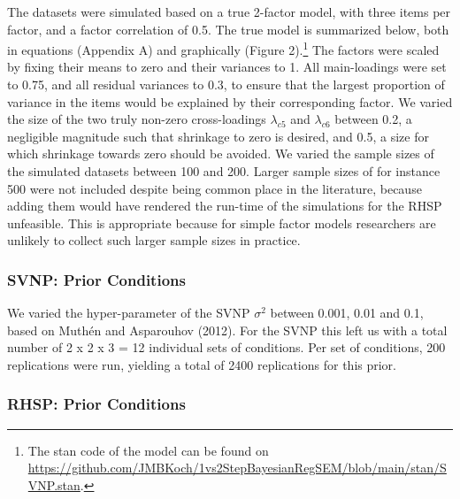 \documentclass[
  man, donotrepeattitle,floatsintext]{apa6}
\begin{document}
The datasets were simulated based on a true 2-factor model, with three items per factor, and a factor correlation of 0.5. The true model is summarized below, both in equations (Appendix A) and graphically (Figure 2).\footnote{The stan code of the model can be found on \url{https://github.com/JMBKoch/1vs2StepBayesianRegSEM/blob/main/stan/SVNP.stan}.} The factors were scaled by fixing their means to zero and their variances to 1. All main-loadings were set to 0.75, and all residual variances to 0.3, to ensure that the largest proportion of variance in the items would be explained by their corresponding factor. We varied the size of the two truly non-zero cross-loadings \(\lambda_{c 5}\) and \(\lambda_{c 6}\) between 0.2, a negligible magnitude such that shrinkage to zero is desired, and 0.5, a size for which shrinkage towards zero should be avoided. We varied the sample sizes of the simulated datasets between 100 and 200. Larger sample sizes of for instance 500 were not included despite being common place in the literature, because adding them would have rendered the run-time of the simulations for the RHSP unfeasible. This is appropriate because for simple factor models researchers are unlikely to collect such larger sample sizes in practice.

\hypertarget{svnp-prior-conditions}{%
\subsubsection{SVNP: Prior Conditions}\label{svnp-prior-conditions}}

We varied the hyper-parameter of the SVNP \(\sigma^2\) between 0.001, 0.01 and 0.1, based on Muthén and Asparouhov (2012). For the SVNP this left us with a total number of 2 x 2 x 3 = 12 individual sets of conditions. Per set of conditions, 200 replications were run, yielding a total of 2400 replications for this prior.

\hypertarget{rhsp-prior-conditions}{%
\subsubsection{RHSP: Prior Conditions}\label{rhsp-prior-conditions}}
\end{document}
